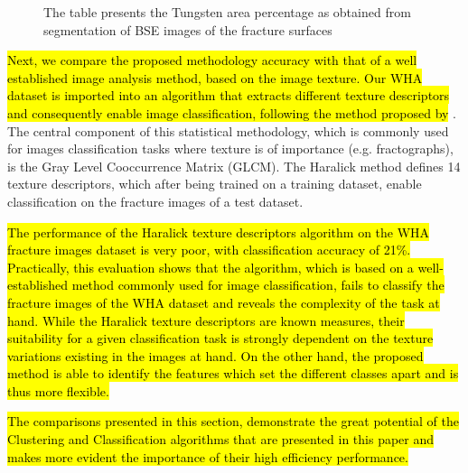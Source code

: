 \documentclass[authoryear,preprint,review,12pt, singleside]{elsarticle}
\begin{document}
\begin{figure}[!h]
	\centering
	\caption{The table presents the Tungsten area percentage as obtained from segmentation of BSE images of the fracture surfaces}
	\label{fig:T2}
\end{figure}

\hl{Next, we compare the proposed methodology accuracy with that of a well established image analysis method, based on the image texture. Our WHA dataset is imported into an algorithm that extracts different texture descriptors and consequently enable image classification, following the method proposed by} \citet{haralick}. The central component of this statistical methodology, which is commonly used for images classification tasks where texture is of importance (e.g. fractographs), is the Gray Level Cooccurrence Matrix (GLCM). The Haralick method defines 14 texture descriptors, which after being trained on a training dataset, enable classification on the fracture images of a test dataset. 

\hl{The performance of the Haralick texture descriptors algorithm on the WHA fracture images dataset is very poor, with classification accuracy of 21\%. Practically, this evaluation shows that the algorithm, which is based on a well-established method commonly used for image classification, fails to classify the fracture images of the WHA dataset and reveals the complexity of the task at hand. While the Haralick texture descriptors are known measures, their suitability for a given classification task is strongly dependent on the texture variations existing in the images at hand. On the other hand, the proposed method is able to identify the features which set the different classes apart and is thus more flexible.}

\hl{The comparisons presented in this section,  demonstrate the great potential of the Clustering and Classification algorithms that are presented in this paper and makes more evident the importance of their high efficiency performance.}
\end{document}
